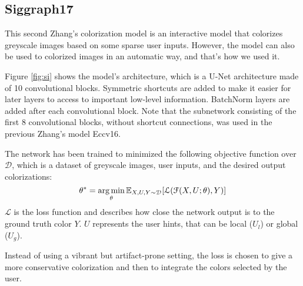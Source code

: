 \subsection{Siggraph17}

This second Zhang's colorization model is an interactive model that colorizes greyscale images based on some sparse
user inputs. However, the model can also be used to colorized images in an automatic way, and that's how we used it.

Figure \ref{fig:si} shows the model's architecture, which is a U-Net architecture made of 10 convolutional blocks.
Symmetric shortcuts are added to make it easier for later layers to access to important low-level information.
BatchNorm layers are added after each convolutional block. Note that the subnetwork consisting of the first 8
convolutional blocks, without shortcut connections, was used in the previous Zhang's model Eccv16.

The network has been trained to minimized the following objective function over $\mathcal{D}$, which is a dataset of
greyscale images, user inputs, and the desired output colorizations:
\begin{equation*}
	\theta^{*} =  \operatorname*{arg\,min}_{\theta} \mathbb{E}_{X, U,Y \sim \mathcal{D}} [ \mathcal{L}( \mathcal{F}(X, U; \theta), Y) ]
\end{equation*}
$\mathcal{L}$ is the loss function and describes how close the network output is to the ground truth color $Y$.
$U$ represents the user hints, that can be local ($U_{l}$) or global ($U_{g}$).

Instead of using a vibrant but artifact-prone setting, the loss is chosen to give a more conservative colorization
and then to integrate the colors selected by the user.



